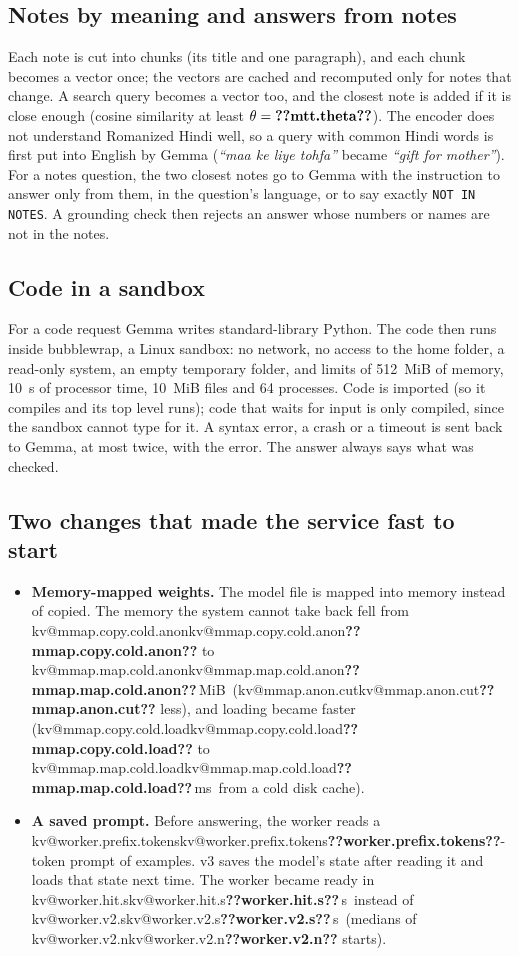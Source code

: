 \documentclass[11pt,a4paper]{article}
\makeatletter
\DeclareRobustCommand{\kv}[1]{\ifcsname kv@#1\endcsname\csname kv@#1\endcsname\else\textbf{??#1??}\fi}
\newcommand{\ms}{\,ms}
\newcommand{\s}{\,s}
\newcommand{\MiB}{\,MiB}
\newcommand{\req}[1]{\textit{``#1''}}
\makeatother
\begin{document}
\subsection{Notes by meaning and answers from notes}
Each note is cut into chunks (its title and one paragraph), and each chunk becomes a vector once; the vectors are cached
and recomputed only for notes that change. A search query becomes a vector too, and the closest note is added if it is
close enough (cosine similarity at least $\theta=\kv{mtt.theta}$). The encoder does not understand Romanized Hindi well,
so a query with common Hindi words is first put into English by Gemma (\req{maa ke liye tohfa} became \req{gift for
mother}). For a notes question, the two closest notes go to Gemma with the instruction to answer only from them, in the
question's language, or to say exactly \texttt{NOT IN NOTES}. A grounding check then rejects an answer whose numbers or
names are not in the notes.

\subsection{Code in a sandbox}
For a code request Gemma writes standard-library Python. The code then runs inside bubblewrap, a Linux sandbox: no
network, no access to the home folder, a read-only system, an empty temporary folder, and limits of 512~MiB of memory,
10~s of processor time, 10~MiB files and 64 processes. Code is imported (so it compiles and its top level runs); code
that waits for input is only compiled, since the sandbox cannot type for it. A syntax error, a crash or a timeout is sent
back to Gemma, at most twice, with the error. The answer always says what was checked.

\subsection{Two changes that made the service fast to start}
\begin{itemize}
  \item \textbf{Memory-mapped weights.} The model file is mapped into memory instead of copied. The memory the system
  cannot take back fell from \kv{mmap.copy.cold.anon} to \kv{mmap.map.cold.anon}\MiB\ (\kv{mmap.anon.cut} less), and
  loading became faster (\kv{mmap.copy.cold.load} to \kv{mmap.map.cold.load}\ms\ from a cold disk cache).
  \item \textbf{A saved prompt.} Before answering, the worker reads a \kv{worker.prefix.tokens}-token prompt of
  examples. v3 saves the model's state after reading it and loads that state next time. The worker became ready in
  \kv{worker.hit.s}\s\ instead of \kv{worker.v2.s}\s\ (medians of \kv{worker.v2.n} starts).
\end{itemize}
\end{document}
